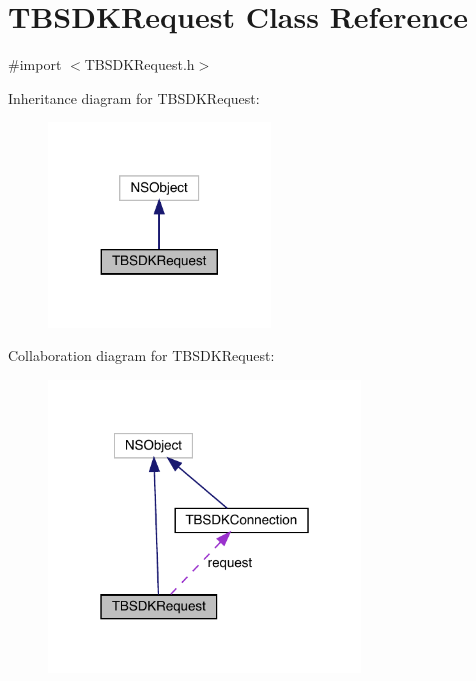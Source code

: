 \hypertarget{interface_t_b_s_d_k_request}{}\section{T\+B\+S\+D\+K\+Request Class Reference}
\label{interface_t_b_s_d_k_request}


{\ttfamily \#import $<$T\+B\+S\+D\+K\+Request.\+h$>$}



Inheritance diagram for T\+B\+S\+D\+K\+Request\+:\nopagebreak
\begin{figure}[H]
\begin{center}
\leavevmode
\includegraphics[width=167pt]{interface_t_b_s_d_k_request__inherit__graph}
\end{center}
\end{figure}


Collaboration diagram for T\+B\+S\+D\+K\+Request\+:\nopagebreak
\begin{figure}[H]
\begin{center}
\leavevmode
\includegraphics[width=235pt]{interface_t_b_s_d_k_request__coll__graph}
\end{center}
\end{figure}
